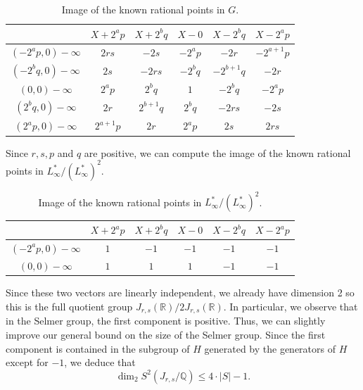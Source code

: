 \documentclass[a4paper, 12pt]{amsart}
\theoremstyle{definition}
\theoremstyle{plain}
\theoremstyle{plain}
\theoremstyle{plain}
\theoremstyle{plain}
\theoremstyle{remark}
\theoremstyle{remark}
\theoremstyle{plain}
\newcommand{\Q}{\mathbb{Q}}
\begin{document}
\begin{table}[h!]
	\begin{center}
		\begin{tabular}{c|c|c|c|c|c}
			& $X+2^ap$ & $X+2^bq$ & $X-0$ & $X-2^bq$ & $X-2^ap$\\ \hline
			$(-2^ap,0)-\infty$&$2rs$ & $-2s$ & $-2^ap$ & $-2r$ & $-2^{a+1}p$\\ \hline
			$(-2^bq,0)-\infty$&$2s$ & $-2rs$ & $-2^bq$ & $-2^{b+1}q$ & $-2r$\\ \hline
			$(0,0)-\infty$&$2^ap$ & $2^bq$ & $1$ & $-2^bq$ & $-2^ap$\\ \hline
			$(2^bq,0)-\infty$&$2r$ & $2^{b+1}q$ & $2^bq$ & $-2rs$ & $-2s$\\ \hline
			$(2^ap,0)-\infty$&$2^{a+1}p$ & $2r$ & $2^ap$ & $2s$ & $2rs$
		\end{tabular}
		\vspace{10pt}
		\caption{Image of the known rational points in $G$.}
	\end{center}
\end{table}

Since $r,s,p$ and $q$ are positive, we can compute the image of the known rational points in $L_\infty^*/(L_\infty^*)^2$.

\begin{table}[h!]
	\begin{center}
		\begin{tabular}{c|c|c|c|c|c}
			& $X+2^ap$ & $X+2^bq$ & $X-0$ & $X-2^bq$ & $X-2^ap$\\ \hline
			$(-2^ap,0)-\infty$&$1$ & $-1$ & $-1$ & $-1$ & $-1$\\ \hline
			$(0,0)-\infty$&$1$ & $1$ & $1$ & $-1$ & $-1$
		\end{tabular}
		\vspace{10pt}
		\caption{Image of the known rational points in $L_\infty^*/(L_\infty^*)^2$.}
	\end{center}
\end{table}

Since these two vectors are linearly independent, we already have dimension 2 so this is the full quotient group $J_{r,s}(\mathbb{R})/2J_{r,s}(\mathbb{R})$. In particular, we observe that in the Selmer group, the first component is positive. Thus, we can slightly improve our general bound on the size of the Selmer group. Since the first component is contained in the subgroup of $H$ generated by the generators of $H$ except for $-1$, we deduce that
\begin{equation*}
	\dim_2 S^2(J_{r,s}/\Q)\le 4\cdot|S|-1.
\end{equation*}
\end{document}
